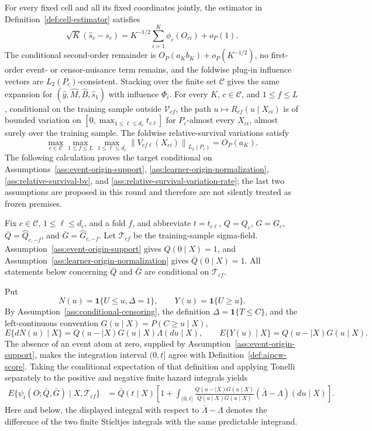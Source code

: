For every fixed cell and all its fixed coordinates jointly, the estimator in Definition~\ref{def:cell-estimator} satisfies
\[
\sqrt K(\widehat s_c-s_c)=K^{-1/2}\sum_{i=1}^K\phi_c(O_{ci})+o_P(1).
\]
The conditional second-order remainder is \(O_P(a_Kb_K)+o_P(K^{-1/2})\), no first-order event- or censor-nuisance term remains, and the foldwise plug-in influence vectors are \(L_2(P_c)\)-consistent. Stacking over the finite set \(\mathcal C\) gives the same expansion for \((\widehat y,\widehat M,\widehat B,\widehat s_1)\) with influence \(\Phi_i\).
For every \(K\), \(c\in\mathcal C\), and \(1\le f\le L\), conditional on the training sample outside \(\mathcal V_{cf}\), the path \(u\mapsto R_{cf}(u\mid X_{ci})\) is of bounded variation on \([0,\max_{1\le\ell\le d_c}t_{c\ell}]\) for \(P_c\)-almost every \(X_{ci}\), almost surely over the training sample.
The foldwise relative-survival variations satisfy
\[
\max_{c\in\mathcal C}\max_{1\le f\le L}\max_{1\le\ell\le d_c}
\left\|V_{cf\ell}(X_{ci})\right\|_{L_2(P_c)}=O_P(a_K).
\]
The following calculation proves the target conditional on Assumptions~\ref{ass:event-origin-support}, \ref{ass:learner-origin-normalization}, \ref{ass:relative-survival-bv}, and \ref{ass:relative-survival-variation-rate}; the last two assumptions are proposed in this round and therefore are not silently treated as frozen premises.

Fix \(c\in\mathcal C\), \(1\le \ell\le d_c\), and a fold \(f\), and abbreviate \(t=t_{c\ell}\), \(Q=Q_c\), \(G=G_c\), \(\bar Q=\widehat Q_{c,-f}\), and \(\bar G=\widehat G_{c,-f}\).  Let \(\mathcal T_{cf}\) be the training-sample sigma-field.  Assumption~\ref{ass:event-origin-support} gives \(Q(0\mid X)=1\), and Assumption~\ref{ass:learner-origin-normalization} gives \(\bar Q(0\mid X)=1\).  All statements below concerning \(\bar Q\) and \(\bar G\) are conditional on \(\mathcal T_{cf}\).

Put
\[
N(u)=\mathbf 1\{U\le u,\Delta=1\},
\qquad
Y(u)=\mathbf 1\{U\ge u\}.
\]
By Assumption~\ref{ass:conditional-censoring}, the definition \(\Delta=\mathbf 1\{T\le C\}\), and the left-continuous convention \(G(u\mid X)=P(C\ge u\mid X)\),
\[
E\{dN(u)\mid X\}=Q(u-\mid X)G(u\mid X)\Lambda(du\mid X),
\qquad
E\{Y(u)\mid X\}=Q(u-\mid X)G(u\mid X).
\]
The absence of an event atom at zero, supplied by Assumption~\ref{ass:event-origin-support}, makes the integration interval \((0,t]\) agree with Definition~\ref{def:aipcw-score}.  Taking the conditional expectation of that definition and applying Tonelli separately to the positive and negative finite hazard integrals yields
\[
\begin{aligned}
E\{\psi_t(O;\bar Q,\bar G)\mid X,\mathcal T_{cf}\}
&=\bar Q(t\mid X)\left[
1+\int_{(0,t]}
\frac{Q(u-\mid X)G(u\mid X)}{\bar Q(u\mid X)\bar G(u\mid X)}
(\bar\Lambda-\Lambda)(du\mid X)
\right].
\end{aligned}
\]
Here and below, the displayed integral with respect to \(\bar\Lambda-\Lambda\) denotes the difference of the two finite Stieltjes integrals with the same predictable integrand.

